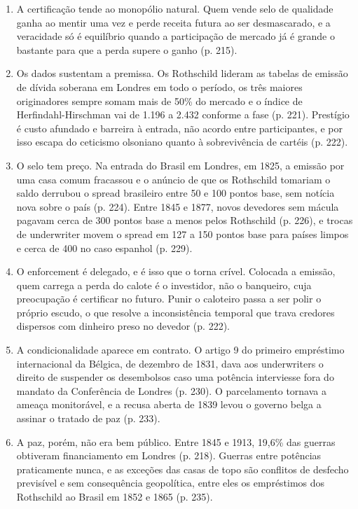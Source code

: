 \begin{enumerate}
\item A certificação tende ao monopólio natural. Quem vende selo de qualidade
ganha ao mentir uma vez e perde receita futura ao ser desmascarado, e a
veracidade só é equilíbrio quando a participação de mercado já é grande o
bastante para que a perda supere o ganho (p. 215).

\item Os dados sustentam a premissa. Os Rothschild lideram as tabelas de
emissão de dívida soberana em Londres em todo o período, os três maiores
originadores sempre somam mais de 50\% do mercado e o índice de
Herfindahl-Hirschman vai de 1.196 a 2.432 conforme a fase (p. 221). Prestígio
é custo afundado e barreira à entrada, não acordo entre participantes, e por
isso escapa do ceticismo olsoniano quanto à sobrevivência de cartéis (p. 222).

\item O selo tem preço. Na entrada do Brasil em Londres, em 1825, a emissão
por uma casa comum fracassou e o anúncio de que os Rothschild tomariam o saldo
derrubou o spread brasileiro entre 50 e 100 pontos base, sem notícia nova
sobre o país (p. 224). Entre 1845 e 1877, novos devedores sem mácula pagavam
cerca de 300 pontos base a menos pelos Rothschild (p. 226), e trocas de
underwriter movem o spread em 127 a 150 pontos base para países limpos e cerca
de 400 no caso espanhol (p. 229).

\item O enforcement é delegado, e é isso que o torna crível. Colocada a
emissão, quem carrega a perda do calote é o investidor, não o banqueiro, cuja
preocupação é certificar no futuro. Punir o caloteiro passa a ser polir o
próprio escudo, o que resolve a inconsistência temporal que trava credores
dispersos com dinheiro preso no devedor (p. 222).

\item A condicionalidade aparece em contrato. O artigo 9 do primeiro
empréstimo internacional da Bélgica, de dezembro de 1831, dava aos
underwriters o direito de suspender os desembolsos caso uma potência
interviesse fora do mandato da Conferência de Londres (p. 230). O
parcelamento tornava a ameaça monitorável, e a recusa aberta de 1839 levou o
governo belga a assinar o tratado de paz (p. 233).

\item A paz, porém, não era bem público. Entre 1845 e 1913, 19,6\% das guerras
obtiveram financiamento em Londres (p. 218). Guerras entre potências
praticamente nunca, e as exceções das casas de topo são conflitos de desfecho
previsível e sem consequência geopolítica, entre eles os empréstimos dos
Rothschild ao Brasil em 1852 e 1865 (p. 235).
\end{enumerate}


